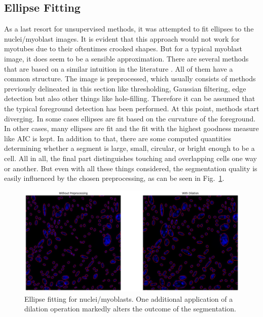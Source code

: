 \subsection{Ellipse Fitting}
As a last resort for unsupervised methods, it was attempted to fit ellipses to the nuclei/myoblast images. It is evident that this approach would not work for myotubes due to their oftentimes crooked shapes. But for a typical myoblast image, it does seem to be a sensible approximation. There are several methods that are based on a similar intuition in the literature \cite{panagiotakis2020region, panagiotakis2018cell, kothari2009automated}. All of them have a common structure. The image is preprocessed, which usually consists of methods previously delineated in this section like thresholding, Gaussian filtering, edge detection but also other things like hole-filling. Therefore it can be assumed that the typical foreground detection has been performed. At this point, methods start diverging. In some cases ellipses are fit based on the curvature of the foreground. In other cases, many ellipses are fit and the fit with the highest goodness measure like AIC is kept. In addition to that, there are some computed quantities determining whether a segment is large, small, circular, or bright enough to be a cell. All in all, the final part distinguishes touching and overlapping cells one way or another. But even with all these things considered, the segmentation quality is easily influenced by the chosen preprocessing, as can be seen in Fig.~\ref{figellipsefitting}. 
\begin{figure}
	\centering
	\includegraphics[width=\textwidth]{"images/ellipsefitting.png"}
	\caption[Ellipse Fitting as segmentation]{Ellipse fitting for nuclei/myoblasts. One additional application of a dilation operation markedly alters the outcome of the segmentation.}
	\label{figellipsefitting}
\end{figure}
